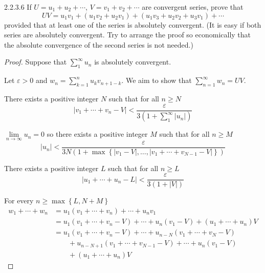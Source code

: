 \begin{problem}{2.2.3.6}
If \( U = u_{1} + u_{2} + \cdots \), \( V = v_{1} + v_{2} + \cdots \) are convergent series, prove that
\[
	UV = u_{1}v_{1} + (u_{1}v_{2} + u_{2}v_{1}) + (u_{1}v_{3} + u_{2}v_{2} + u_{3}v_{1}) + \cdots
\]
provided that at least one of the series is absolutely convergent. (It is easy if both series are absolutely convergent. Try to arrange the proof so economically that the absolute convergence of the second series is not needed.)
\end{problem}

\begin{proof}
	Suppose that \( \sum_{1}^{\infty} u_{n} \) is absolutely convergent.

	Let \( \varepsilon > 0 \) and \( w_{n} = \sum_{k=1}^{n} u_{k}v_{n+1-k} \). We aim to show that \( \sum_{n=1}^{\infty} w_{n} = UV \).

	There exists a positive integer \( N \) such that for all \( n \ge N \)
	\[
		\left\vert v_{1} + \cdots + v_{n} - V \right\vert < \dfrac{\varepsilon}{3\left(1 + \sum_{1}^{\infty} \left\vert u_{n} \right\vert \right)}
	\]

	\( \lim\limits_{n\to\infty} u_{n} = 0 \) so there exists a positive integer \( M \) such that for all \( n \ge M \)
	\[
		\left\vert u_{n} \right\vert < \dfrac{\varepsilon}{3N(1 + \max\left\{ \left\vert v_{1} - V \right\vert, \ldots, \left\vert v_{1} + \cdots + v_{N-1} - V \right\vert \right\})}
	\]

	There exists a positive integer \( L \) such that for all \( n \ge L \)
	\[
		\left\vert u_{1} + \cdots + u_{n} - L \right\vert < \dfrac{\varepsilon}{3(1 + \left\vert V \right\vert)}
	\]

	For every \( n \ge \max\left\{ L, N + M \right\} \)
	\begingroup
	\allowdisplaybreaks%
	\begin{align*}
		w_{1} + \cdots + w_{n} & = u_{1}(v_{1} + \cdots + v_{n}) + \cdots + u_{n}v_{1}                                       \\
		                       & = u_{1}(v_{1} + \cdots + v_{n} - V) + \cdots + u_{n}(v_{1} - V) + (u_{1} + \cdots + u_{n})V \\
		                       & = u_{1}(v_{1} + \cdots + v_{n} - V) + \cdots + u_{n-N}(v_{1} + \cdots + v_{N} - V)          \\
		                       & \qquad + u_{n-N+1}(v_{1} + \cdots + v_{N-1} - V) + \cdots + u_{n}(v_{1} - V)                \\
		                       & \qquad + (u_{1} + \cdots + u_{n})V
	\end{align*}
	\endgroup


\end{proof}
